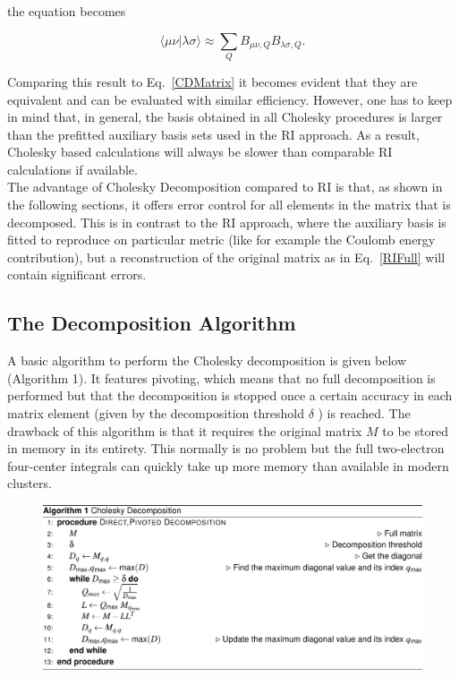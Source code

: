 the equation becomes 

\begin{equation}
\langle \mu \nu | \lambda \sigma \rangle \approx \sum_{Q} B_{\mu \nu,Q} B_{\lambda \sigma,Q}.
\end{equation} 

Comparing this result to Eq.~\ref{CDMatrix} it becomes evident that they are equivalent and can be evaluated with similar efficiency. However, one has to keep in mind that, in general, the basis obtained in all Cholesky procedures is larger than the prefitted auxiliary basis sets used in the RI approach. As a result, Cholesky based calculations will always be slower than comparable RI calculations if available.\\

The advantage of Cholesky Decomposition compared to RI is that, as shown in the following sections, it offers error control for all elements in the matrix that is decomposed. This is in contrast to the RI approach, where the auxiliary basis is fitted to reproduce on particular metric (like for example the Coulomb energy contribution), but a reconstruction of the original matrix as in Eq.~\ref{RIFull} will contain significant errors.


\subsection{The Decomposition Algorithm}

A basic algorithm to perform the Cholesky decomposition is given below (Algorithm 1). It features pivoting, which means that no full decomposition is performed but that the decomposition is stopped once a certain accuracy in each matrix element (given by the decomposition threshold $\delta$ ) is reached. The drawback of this algorithm is that it requires the original matrix $M$ to be stored in memory in its entirety. This normally is no problem but the full two-electron four-center integrals can quickly take up more memory than available in modern clusters.

\begin{figure}[h!]
	\includegraphics[width=\textwidth]{cholesky/algorithm1.png}
\end{figure}

